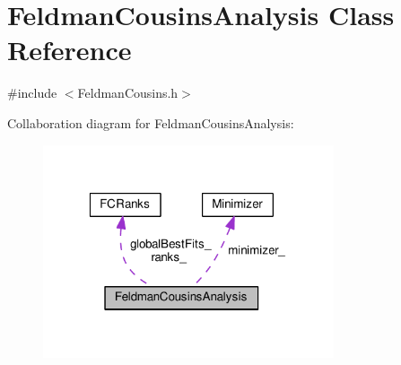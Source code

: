 \hypertarget{classFeldmanCousinsAnalysis}{\section{Feldman\-Cousins\-Analysis Class Reference}
\label{classFeldmanCousinsAnalysis}
}


{\ttfamily \#include $<$Feldman\-Cousins.\-h$>$}



Collaboration diagram for Feldman\-Cousins\-Analysis\-:
\nopagebreak
\begin{figure}[H]
\begin{center}
\leavevmode
\includegraphics[width=243pt]{classFeldmanCousinsAnalysis__coll__graph}
\end{center}
\end{figure}
